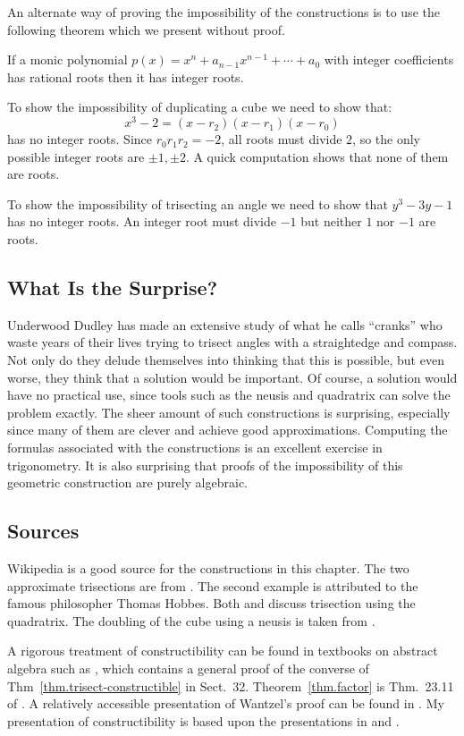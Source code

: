 An alternate way of proving the impossibility of the constructions is to use the following theorem which we present without proof.

\begin{theorem}\label{thm.factor}
If a monic polynomial $p(x)=x^n+a_{n-1}x^{n-1}+\cdots+a_0$ with integer coefficients has rational roots then it has integer roots.
\end{theorem}

To show the impossibility of duplicating a cube we need to show that:
\[
x^3-2=(x-r_2)(x-r_1)(x-r_0)
\]
has no integer roots. Since $r_0r_1r_2=-2$, all roots must divide $2$, so the only possible integer roots are $\pm 1, \pm 2$. A quick computation shows that none of them are roots.

To show the impossibility of trisecting an angle we need to show that $y^3-3y-1$ has no integer roots. An integer root must divide $-1$ but neither $1$ nor $-1$ are roots.

\subsection*{What Is the Surprise?}

Underwood Dudley has made an extensive study of what he calls ``cranks'' who waste years of their lives trying to trisect angles with a straightedge and compass. Not only do they delude themselves into thinking that this is possible, but even worse, they think that a solution would be important. Of course, a solution would have no practical use, since tools such as the neusis and quadratrix can solve the problem exactly. The sheer amount of such constructions is surprising, especially since many of them are clever and achieve good approximations. Computing the formulas associated with the constructions is an excellent exercise in trigonometry. It is also surprising that proofs of the impossibility of this geometric construction are purely algebraic.

\subsection*{Sources}

Wikipedia \cite{wiki:tri, wiki:neu, wiki:quad} is a good source for the constructions in this chapter.
The two approximate trisections are from \cite[pp.
~67--68, 95--96]{dudley-budget}. The second example is attributed to the famous philosopher Thomas Hobbes. Both \cite[pp.~48--49]{martin} and \cite[pp.~6--7]{dudley-budget} discuss trisection using the quadratrix.
The doubling of the cube using a neusis is taken from \cite{dorrie2}.

A rigorous treatment of constructibility can be found in textbooks on abstract algebra such as \cite{fraleigh}, which contains a general proof of the converse of Thm~\ref{thm.trisect-constructible} in Sect.~32.
Theorem~\ref{thm.factor} is Thm.~23.11 of \cite{fraleigh}.
A relatively accessible presentation of Wantzel's proof can be found in \cite{suzuki}. My presentation of constructibility is based upon the presentations in \cite[Chap.~III]{courant} and \cite{laugwitz}.
